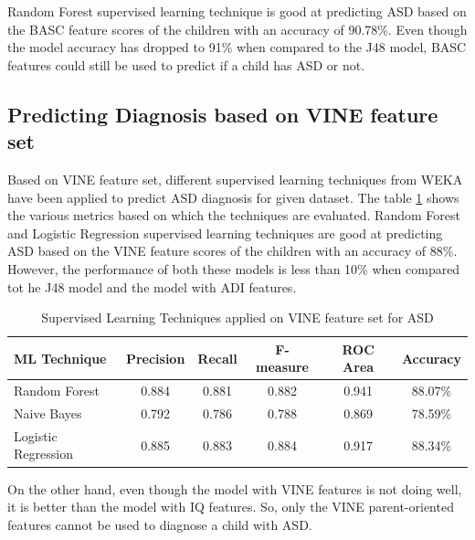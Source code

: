 Random Forest supervised learning technique is good at predicting ASD based on the BASC feature scores of the children with an accuracy of 90.78\%. Even though the model accuracy has dropped to 91\% when compared to the J48 model, BASC features could still be used to predict if a child has ASD or not.

\subsection{Predicting Diagnosis based on VINE feature set}
Based on VINE feature set, different supervised learning techniques from WEKA have been applied to predict ASD diagnosis for given dataset. The table \ref{table:66} shows the various metrics based on which the techniques are evaluated. Random Forest and Logistic Regression supervised learning techniques are good at predicting ASD based on the VINE feature scores of the children with an accuracy of 88\%. However, the performance of both these models is less than 10\% when compared tot he J48 model and the model with ADI features. 
\begin{table}[h]
\begin{center}
\begin{tabular}{|l|c|c|c|c|c|}
\hline
\textbf{ML Technique}&	\textbf{Precision}&	\textbf{Recall}&	\textbf{F-measure}&	\textbf{ROC Area}&	\textbf{Accuracy}\\
\hline \hline
Random Forest&0.884	&0.881&	0.882&	0.941&	88.07\%\\
\hline
Naive Bayes&0.792	&0.786	&0.788	&0.869&	78.59\%\\
\hline
Logistic Regression	&0.885&	0.883&	0.884&	0.917&	88.34\%\\
\hline
\end{tabular}
\end{center}
\caption{Supervised Learning Techniques applied on VINE feature set for ASD }
\label{table:66}
\end{table}

On the other hand, even though the model with VINE features is not doing well, it is better than the model with IQ features. So, only the VINE parent-oriented features cannot be used to diagnose a child with ASD.

